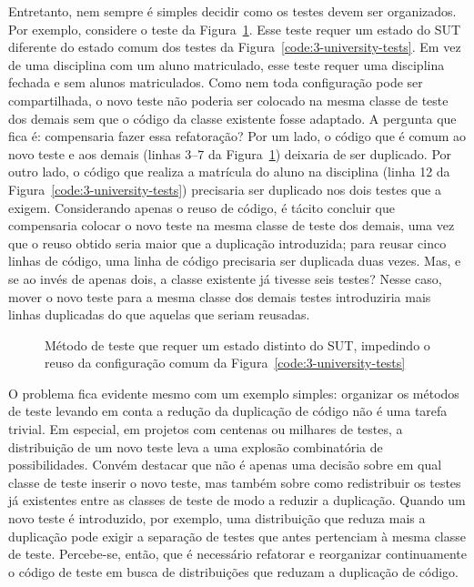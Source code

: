 Entretanto, nem sempre é simples decidir como os testes devem ser organizados. Por exemplo, considere o teste da Figura~\ref{code:4-enroll-student-in-a-closed-course-test}. Esse teste requer um estado do SUT diferente do estado comum dos testes da Figura~\ref{code:3-university-tests}. Em vez de uma disciplina com um aluno matriculado, esse teste requer uma disciplina fechada e sem alunos matriculados. Como nem toda configuração pode ser compartilhada, o novo teste não poderia ser colocado na mesma classe de teste dos demais sem que o código da classe existente fosse adaptado. A pergunta que fica é: compensaria fazer essa refatoração? Por um lado, o código que é comum ao novo teste e aos demais (linhas 3--7 da Figura~\ref{code:4-enroll-student-in-a-closed-course-test}) deixaria de ser duplicado. Por outro lado, o código que realiza a matrícula do aluno na disciplina (linha 12 da Figura~\ref{code:3-university-tests}) precisaria ser duplicado nos dois testes que a exigem. Considerando apenas o reuso de código, é tácito concluir que compensaria colocar o novo teste na mesma classe de teste dos demais, uma vez que o reuso obtido seria maior que a duplicação introduzida; para reusar cinco linhas de código, uma linha de código precisaria ser duplicada duas vezes. Mas, e se ao invés de apenas dois, a classe existente já tivesse seis testes? Nesse caso, mover o novo teste para a mesma classe dos demais testes introduziria mais linhas duplicadas do que aquelas que seriam reusadas.

\begin{figure}[htb]
	\centering
	
	\caption{Método de teste que requer um estado distinto do SUT, impedindo o reuso da configuração comum da Figura~\ref{code:3-university-tests}}
	\label{code:4-enroll-student-in-a-closed-course-test}
\end{figure}

O problema fica evidente mesmo com um exemplo simples: organizar os métodos de teste levando em conta a redução da duplicação de código não é uma tarefa trivial. Em especial, em projetos com centenas ou milhares de testes, a distribuição de um novo teste leva a uma explosão combinatória de possibilidades. Convém destacar que não é apenas uma decisão sobre em qual classe de teste inserir o novo teste, mas também sobre como redistribuir os testes já existentes entre as classes de teste de modo a reduzir a duplicação. Quando um novo teste é introduzido, por exemplo, uma distribuição que reduza mais a duplicação pode exigir a separação de testes que antes pertenciam à mesma classe de teste. Percebe-se, então, que é necessário refatorar e reorganizar continuamente o código de teste em busca de distribuições que reduzam a duplicação de código.

